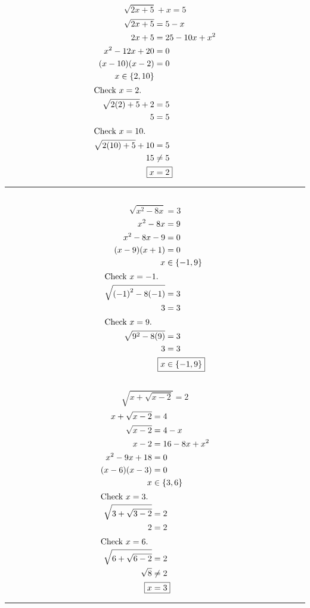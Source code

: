 	\subsection{}
		\[\sqrt{2x + 5} + x = 5\]
		\begin{align*}
			\sqrt{2x + 5} &= 5 - x \\
			2x + 5 &= 25 - 10x + x^2 \\
			x^2 - 12x + 20 &= 0 \\
			(x - 10)(x - 2) &= 0 \\
			x \in \{2, 10\} \\
			\intertext{Check $x = 2$.}
			\sqrt{2(2) + 5} + 2 &= 5 \\
			5 &= 5 \\
			\intertext{Check $x = 10$.}
			\sqrt{2(10) + 5} + 10 &= 5 \\
			15 &\neq 5 \\
			\Aboxed{x &= 2}
		\end{align*}
		\hrule{}

	\subsection{}
		\[\sqrt{x^2 - 8x} = 3\]
		\begin{align*}
			x^2 - 8x &= 9 \\
			x^2 - 8x - 9 &= 0 \\
			(x - 9)(x + 1) &= 0 \\
			x &\in \{-1, 9\} \\
			\intertext{Check $x = -1$.}
			\sqrt{{(-1)}^2 - 8(-1)} &= 3 \\
			3 &= 3 \\
			\intertext{Check $x = 9$.}
			\sqrt{9^2 - 8(9)} &= 3 \\
			3 &= 3 \\
			\Aboxed{x &\in \{-1, 9\}}
		\end{align*}
		\pagebreak{}

	\subsection{}
		\[\sqrt{x + \sqrt{x - 2}} = 2\]
		\begin{align*}
			x + \sqrt{x - 2} &= 4 \\
			\sqrt{x - 2} &= 4 - x \\
			x - 2 &= 16 - 8x + x^2 \\
			x^2 - 9x + 18 &= 0 \\
			(x - 6)(x - 3) &= 0 \\
			x &\in \{3, 6\} \\
			\intertext{Check $x = 3$.}
			\sqrt{3 + \sqrt{3 - 2}} &= 2 \\
			2 &= 2 \\
			\intertext{Check $x = 6$.}
			\sqrt{6 + \sqrt{6 - 2}} &= 2 \\
			\sqrt{8} &\neq 2 \\
			\Aboxed{x &= 3}
		\end{align*}
		\hrule{}

